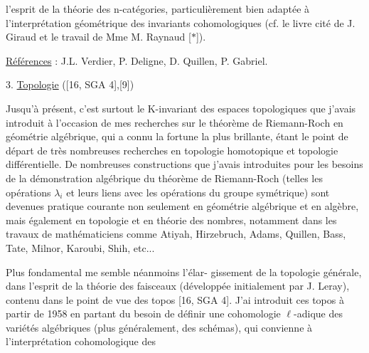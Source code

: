 
l'esprit de la théorie des n-catégories, particulièrement
bien adaptée à l'interprétation géométrique des invariants
cohomologiques (cf. le livre cité de J. Giraud et
le travail de Mme M. Raynaud [$*$]).

\uline{Références} : J.L. Verdier, P. Deligne, D. Quillen,
P. Gabriel.

3. \uline{Topologie} ([16, SGA 4],[9])

Jusqu'à présent, c'est surtout le K-invariant
des espaces topologiques que j'avais introduit à l'occasion
de mes recherches sur le théorème de Riemann-Roch en
géométrie algébrique, qui a connu la fortune la plus
brillante, étant le point de départ de très nombreuses
recherches en topologie homotopique et topologie
différentielle. De nombreuses constructions que j'avais
introduites pour les besoins de la démonstration algébrique
du théorème de Riemann-Roch (telles les opérations $\lambda_{i}$
et leurs liens avec les opérations du groupe symétrique)
sont devenues pratique courante non seulement en géométrie
algébrique et en algèbre, mais également en topologie
et en théorie des nombres, notamment dans les travaux
de mathématiciens comme Atiyah, Hirzebruch, Adams, Quillen,
Bass, Tate, Milnor, Karoubi, Shih, etc...

Plus fondamental me semble néanmoins l'élar-%
gissement de la topologie générale, dans l'esprit de
la théorie des faisceaux (développée initialement par
J. Leray), contenu dans le point de vue des topos
[16, SGA 4]. J'ai introduit ces topos à partir de 1958
en partant du besoin de définir une cohomologie $\ell$-adique
des variétés algébriques (plus généralement, des schémas),
qui convienne à l'interprétation cohomologique des

